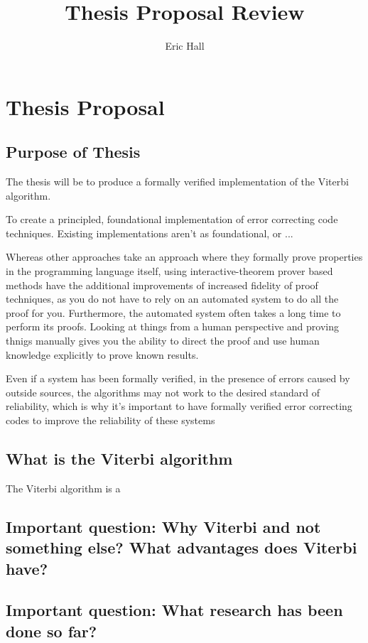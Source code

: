 \documentclass{article}
\title{Thesis Proposal Review}
\author{Eric Hall}
\begin{document}
\maketitle

\section{Thesis Proposal}

\subsection{Purpose of Thesis}

The thesis will be to produce a formally verified implementation of the Viterbi algorithm.

To create a principled, foundational implementation of error correcting code techniques. Existing implementations aren't as foundational, or ...

Whereas other approaches take an approach where they formally prove properties in the programming language itself, using interactive-theorem prover based methods have the additional improvements of increased fidelity of proof techniques, as you do not have to rely on an automated system to do all the proof for you. Furthermore, the automated system often takes a long time to perform its proofs. Looking at things from a human perspective and proving thnigs manually gives you the ability to direct the proof and use human knowledge explicitly to prove known results.

Even if a system has been formally verified, in the presence of errors caused by outside sources, the algorithms may not work to the desired standard of reliability, which is why it's important to have formally verified error correcting codes to improve the reliability of these systems

\subsection{What is the Viterbi algorithm}

The Viterbi algorithm is a 

\subsection{Important question: Why Viterbi and not something else? What advantages does Viterbi have?}

\subsection{Important question: What research has been done so far?}
\end{document}

